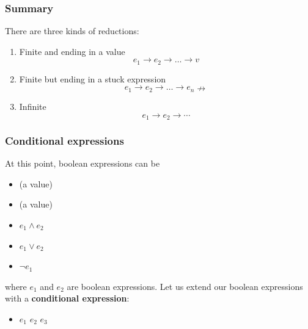 \documentclass[compress,dvipdfmx]{beamer}
\begin{document}
%
\begin{frame}
  \frametitle{Summary}

  There are three kinds of reductions:
  \begin{enumerate}

    \item Finite and ending in a value
  \[e_1 \rightarrow e_2 \rightarrow \dots \rightarrow v\]

    \item Finite but ending in a stuck expression
  \[e_1 \rightarrow e_2 \rightarrow \dots \rightarrow e_n
    \nrightarrow\]

    \item Infinite
  \[e_1 \rightarrow e_2 \rightarrow \cdots\]

  \end{enumerate}

\end{frame}


%
\begin{frame}
  \frametitle{Conditional expressions}

  At this point, boolean expressions can be
  \begin{itemize}

    \item \Xtrue (a value)

    \item \Xfalse (a value)

    \item \(e_1 \wedge e_2\)

    \item \(e_1 \vee e_2\)

    \item \(\neg e_1\)

  \end{itemize}
  where \(e_1\) and \(e_2\) are boolean expressions. Let us extend our
  boolean expressions with a \textbf{conditional expression}:
  \begin{itemize}

     \item \Xif \(e_1\) \Xthen \(e_2\) \Xelse \(e_3\)

  \end{itemize}

\end{frame}
\end{document}
